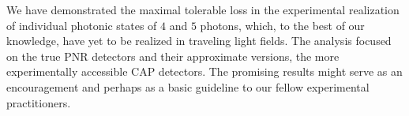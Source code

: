 \documentclass{article}
\begin{document}
We have demonstrated the maximal tolerable loss in the experimental realization of individual photonic states of $4$ and $5$ photons, which, to the best of our knowledge, have yet to be realized in traveling light fields. The analysis focused on the true PNR detectors and their approximate versions, the more experimentally accessible CAP detectors. The promising results might serve as an encouragement and perhaps as a basic guideline to our fellow experimental practitioners.

%

\FloatBarrier
\printbibliography[heading = bibnumbered]
\end{document}
